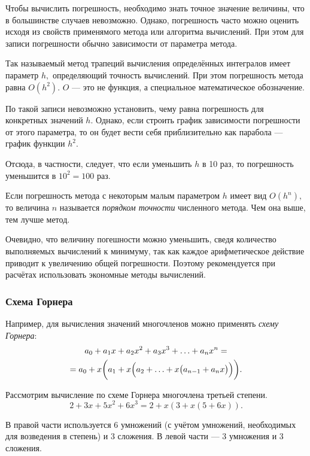 Чтобы вычислить погрешность, необходимо знать точное значение величины,
что в большинстве случаев невозможно. Однако, погрешность часто можно
оценить исходя из свойств применямого метода или алгоритма вычислений.
При этом для записи погрешности обычно зависимости от параметра метода.
\begin{example}
Так называемый метод трапеций вычисления определённых интегралов имеет
параметр $h,$ определяющий точность вычислений. При этом погрешность
метода равна $O(h^{2}).$ $O$ — это не функция, а специальное математическое
обозначение.

По такой записи невозможно установить, чему равна погрешность для
конкретных значений $h.$ Однако, если строить график зависимости
погрешности от этого параметра, то он будет вести себя приблизительно
как парабола — график функции $h^{2}.$

Отсюда, в частности, следует, что если уменьшить $h$ в 10 раз, то
погрешность уменьшится в $10^{2}=100$ раз.
\end{example}
\smallskip{}


Если погрешность метода с некоторым малым параметром $h$ имеет вид
$O(h^{n}),$ то величина $n$ называется \emph{порядком точности}
численного метода. Чем она выше, тем лучше метод.

Очевидно, что величину погешности можно уменьшить, сведя количество
выполняемых вычислений к минимуму, так как каждое арифметическое действие
приводит к увеличению общей погрешности. Поэтому рекомендуется при
расчётах использовать экономные методы вычислений.


\subsubsection{Схема Горнера}

Например, для вычисления значений многочленов можно применять \emph{схему
Горнера}:
\begin{multline*}
a_{0}+a_{1}x+a_{2}x^{2}+a_{3}x^{3}+\ldots+a_{n}x^{n}=\\
=a_{0}+x\biggl(a_{1}+x\Bigl(a_{2}+\ldots+x\bigl(a_{n-1}+a_{n}x\bigr)\Bigr)\biggr).
\end{multline*}

\begin{example}
Рассмотрим вычисление по схеме Горнера многочлена третьей степени.
\[
2+3x+5x^{2}+6x^{3}=2+x(3+x(5+6x)).
\]


В правой части используется 6 умножений (с учётом умножений, необходимых
для возведения в степень) и 3 сложения. В левой части — 3 умножения
и 3 сложения.
\end{example}
\smallskip{}


